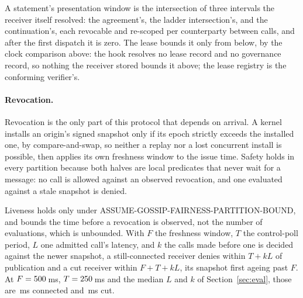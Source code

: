 A statement's presentation window is the intersection of three intervals the
receiver itself resolved: the agreement's, the ladder intersection's, and the
continuation's, each revocable and re-scoped per counterparty between calls,
and after the first dispatch it is zero. The lease bounds it only from below,
by the clock comparison above: the hook resolves no lease record and no
governance record, so nothing the receiver stored bounds it above; the lease
registry is the conforming verifier's.

\paragraph{Revocation.}
Revocation is the only part of this protocol that depends on arrival. A kernel
installs an origin's signed snapshot only if its epoch strictly exceeds the
installed one, by compare-and-swap, so neither a replay nor a lost concurrent
install is possible, then applies its own freshness window to the issue time.
Safety holds in every partition because both halves are local predicates that
never wait for a message: no call is allowed against an observed revocation,
and one evaluated against a stale snapshot is denied.

Liveness holds only under ASSUME-GOSSIP-FAIRNESS-PARTITION-BOUND, and bounds the
time before a revocation is observed, not the number of evaluations, which is
unbounded. With $F$ the freshness window, $T$ the control-poll period, $L$
one admitted call's latency, and $k$ the calls made before one is decided
against the newer snapshot, a still-connected receiver denies within $T + kL$ of
publication and a cut receiver within $F + T + kL$, its snapshot first ageing
past $F$. At $F = 500$\,ms, $T = 250$\,ms and the median
$L$ and $k$ of Section~\ref{sec:eval}, those are
\,ms
connected and
\,ms
cut.
